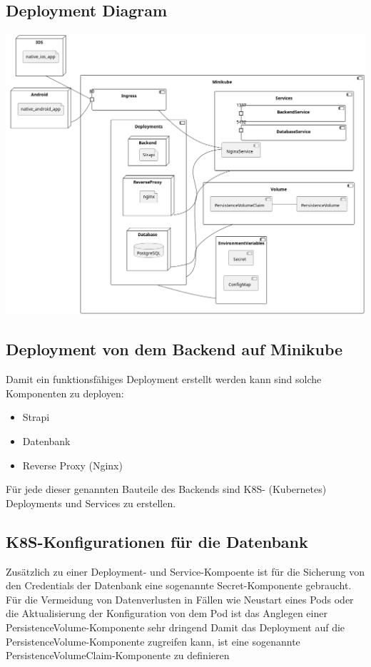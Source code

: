 \subsection{Deployment Diagram}
\begin{center}
  \includegraphics[width=\textwidth]{pics/dev-deployment.png}
\end{center}
\subsection{Deployment von dem Backend auf Minikube}

Damit ein funktionsfähiges Deployment erstellt werden kann sind solche Komponenten zu deployen:
\begin{itemize}
  \item Strapi
  \item Datenbank
  \item Reverse Proxy (Nginx)
\end{itemize}

Für jede dieser genannten Bauteile des Backends sind K8S- (Kubernetes) Deployments und Services zu erstellen.

\subsection{K8S-Konfigurationen für die Datenbank}
Zusätzlich zu einer Deployment- und Service-Kompoente ist für die Sicherung
von den Credentials der Datenbank eine sogenannte
Secret-Komponente gebraucht.
Für die Vermeidung von Datenverlusten in Fällen
wie Neustart eines Pods oder die Aktualisierung
der Konfiguration von dem Pod ist
das Anglegen einer PersistenceVolume-Komponente sehr dringend
Damit das Deployment auf die PersistenceVolume-Komponente zugreifen kann, ist eine sogenannte PersistenceVolumeClaim-Komponente zu definieren

